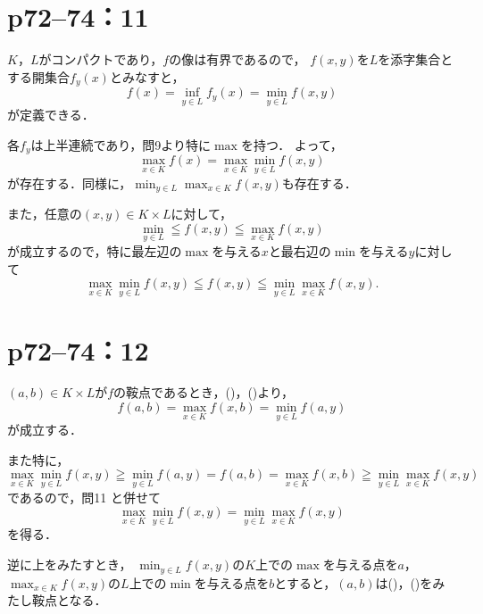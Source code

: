 \section*{p72--74：11}

\begin{tproof}
    $K$，$L$がコンパクトであり，$f$の像は有界であるので，
    $f(x,y)$を$L$を添字集合とする開集合$f_y (x)$とみなすと，
    \[
        f(x) =\inf_{y \in L} f_y (x)=\min_{y \in L} f(x,y)
    \]
    が定義できる．

    各$f_y$は上半連続であり，問9より特に$\max $を持つ．
    よって，
    \[
        \max_{x \in K} f(x) = \max_{x \in K} \min_{y \in L} f(x,y)
    \]
    が存在する．同様に，$\min_{y \in L} \max_{x \in K} f(x,y)$も存在する．

    また，任意の$(x,y) \in K \times L$に対して，
    \[
        \min_{y \in L} \leqq f(x,y) \leqq \max_{x \in K} f(x,y)
    \]
    が成立するので，特に最左辺の$\max$を与える$x$と最右辺の$\min$を与える$y$に対して
    \[
        \max_{x \in K} \min_{y \in L} f(x,y) \leqq f(x,y) \leqq \min_{y \in L} \max_{x \in K} f(x,y).
    \]
\end{tproof}




\section*{p72--74：12}

\begin{tproof}
    $(a,b) \in K \times L$が$f$の鞍点であるとき，()，()より，
    \[
        f(a,b) = \max_{x \in K} f(x,b) = \min_{y \in L} f(a,y)
    \]
    が成立する．

    また特に，
    \[
        \max_{x \in K} \min_{y \in L} f(x,y) \geqq \min_{y \in L} f(a,y) =f(a,b)= \max_{x \in K} f(x,b) \geqq \min_{y \in L} \max_{x \in K} f(x,y)
    \]
    であるので，問11 と併せて
    \[
        \max_{x \in K} \min_{y \in L} f(x,y) = \min_{y \in L} \max_{x \in K} f(x,y)
    \]
    を得る．

    逆に上をみたすとき，
    $\min_{y \in L} f(x,y)$の$K$上での$\max$を与える点を$a$，
    $\max_{x \in K} f(x,y)$の$L$上での$\min$を与える点を$b$とすると，$(a,b)$は()，()をみたし鞍点となる．
\end{tproof}



